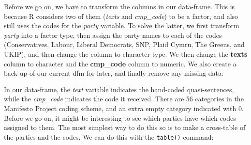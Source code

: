 \documentclass[
]{book}
\newenvironment{Shaded}{\begin{snugshade}}{\end{snugshade}}
\newcommand{\AttributeTok}[1]{\textcolor[rgb]{0.77,0.63,0.00}{#1}}
\newcommand{\DecValTok}[1]{\textcolor[rgb]{0.00,0.00,0.81}{#1}}
\newcommand{\FunctionTok}[1]{\textcolor[rgb]{0.00,0.00,0.00}{#1}}
\newcommand{\NormalTok}[1]{#1}
\newcommand{\OtherTok}[1]{\textcolor[rgb]{0.56,0.35,0.01}{#1}}
\newcommand{\SpecialCharTok}[1]{\textcolor[rgb]{0.00,0.00,0.00}{#1}}
\newcommand{\StringTok}[1]{\textcolor[rgb]{0.31,0.60,0.02}{#1}}
\begin{document}
Before we go on, we have to transform the columns in our data-frame. This is because R considers two of them (\emph{texts} and \emph{cmp\_code}) to be a factor, and also still uses the codes for the \emph{party} variable. To solve the latter, we first transform \emph{party} into a factor type, then assign the party names to each of the codes (Conservatives, Labour, Liberal Democrats, SNP, Plaid Cymru, The Greens, and UKIP), and then change the column to character type. We then change the \textbf{texts} column to character and the \textbf{cmp\_code} column to numeric. We also create a back-up of our current dfm for later, and finally remove any missing data:

\begin{Shaded}
\end{Shaded}

In our data-frame, the \emph{text} variable indicates the hand-coded quasi-sentences, while the \emph{cmp\_code} indicates the code it received. There are 56 categories in the Manifesto Project coding scheme, and an extra empty category indicated with 0. Before we go on, it might be interesting to see which parties have which codes assigned to them. The most simplest way to do this so is to make a cross-table of the parties and the codes. We can do this with the \texttt{table()} command:
\end{document}
